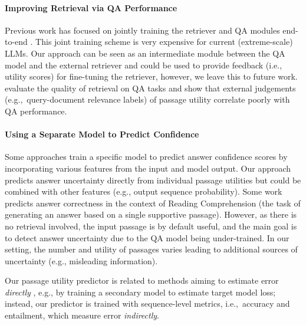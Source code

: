 \paragraph{Improving Retrieval via QA Performance}

Previous work has focused on jointly training the retriever and QA
modules end-to-end
\citep{lee-etal-2019-latent,rag-lewis,izacard2021distilling}.  This
joint training scheme is very expensive for current (extreme-scale)
LLMs. Our approach can be seen as an intermediate module between the
QA model and the external retriever and could be used to provide
feedback (i.e., utility scores) for fine-tuning the retriever,
however, we leave this to future
work. \citet{retrieval:quality:eval:siggir} evaluate the quality of
retrieval on QA tasks and show that external judgements
(e.g.,~query-document relevance labels) of passage utility correlate
poorly with QA performance.


\paragraph{Using a Separate Model to Predict Confidence} Some
approaches train a specific model to predict answer confidence scores
\citep{dong-etal-2018-confidence,kamath-etal-2020-selective,zhang-etal-2021-knowing,mielke-etal-2022-reducing}
by incorporating various features from the input and model output.
Our approach predicts answer uncertainty directly from individual
passage utilities but could be combined with other features (e.g.,
output sequence probability). Some work
\cite{kamath-etal-2020-selective,zhang-etal-2021-knowing} predicts
answer correctness in the context of Reading Comprehension (the
task of generating an answer based on a single supportive
passage). However, as there is no retrieval involved, the input
passage is by default useful, and the main goal is to detect answer
uncertainty due to the QA model being under-trained. In our setting,
the number and utility of passages varies leading to additional sources of
uncertainty (e.g., misleading information).

Our passage utility predictor is related to methods aiming to estimate
error \emph{directly} \cite{lahlou2023deup}, e.g., by training a
secondary model to estimate target model loss; instead, our predictor is trained
with sequence-level metrics, i.e.,~accuracy and entailment, which
measure error \emph{indirectly}.